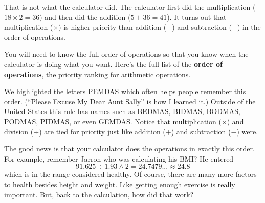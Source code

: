 That is not what the calculator did.  The calculator first did the multiplication ($18 \times 2 = 36$) and then did the addition ($5+36=41$).  It turns out that multiplication ($\times$) is higher priority than addition ($+$) and subtraction ($-$) in the order of operations.

You will need to know the full order of operations so that you know when the calculator is doing what you want.  Here's the full list of the  \textbf{order of operations}, the priority ranking for arithmetic operations.

\bigskip

\bigskip
\bigskip

We highlighted the letters PEMDAS  which often helps people remember this order. (``Please Excuse My Dear Aunt Sally'' is how I learned it.)  Outside of the United States this rule has names such as BEDMAS, BIDMAS, BODMAS, PODMAS, PIDMAS, or even GEMDAS. 
Notice that multiplication ($\times$) and division ($\div$) are tied for priority just like addition ($+$) and subtraction ($-$) were.  

The good news is that your calculator does the operations in exactly this order.  For example, remember Jarron who was calculating his BMI?  He entered 
$$91.625 \div 1.93 \land 2 = 24.7479... \approx 24.8$$ which is in the range considered healthy. Of course, there are many more factors to health besides height and weight. Like getting enough exercise is really important. But, back to the calculation, how did that work?  

